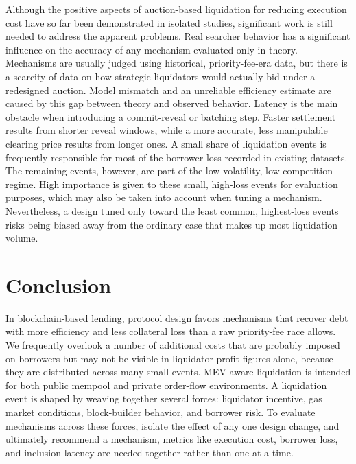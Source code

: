 \documentclass[conference]{IEEEtran}
\begin{document}
Although the positive aspects of auction-based liquidation for reducing
execution cost have so far been demonstrated in isolated studies,
significant work is still needed to address the apparent problems. Real
searcher behavior has a significant influence on the accuracy of any
mechanism evaluated only in theory. Mechanisms are usually judged using
historical, priority-fee-era data, but there is a scarcity of data on
how strategic liquidators would actually bid under a redesigned auction.
Model mismatch and an unreliable efficiency estimate are caused by this
gap between theory and observed behavior. Latency is the main obstacle
when introducing a commit-reveal or batching step. Faster settlement
results from shorter reveal windows, while a more accurate, less
manipulable clearing price results from longer ones. A small share of
liquidation events is frequently responsible for most of the borrower
loss recorded in existing datasets. The remaining events, however, are
part of the low-volatility, low-competition regime. High importance is
given to these small, high-loss events for evaluation purposes, which
may also be taken into account when tuning a mechanism. Nevertheless, a
design tuned only toward the least common, highest-loss events risks
being biased away from the ordinary case that makes up most liquidation
volume.

\section{Conclusion}

In blockchain-based lending, protocol design favors mechanisms that
recover debt with more efficiency and less collateral loss than a raw
priority-fee race allows. We frequently overlook a number of additional
costs that are probably imposed on borrowers but may not be visible in
liquidator profit figures alone, because they are distributed across
many small events. MEV-aware liquidation is intended for both public
mempool and private order-flow environments. A liquidation event is
shaped by weaving together several forces: liquidator incentive, gas
market conditions, block-builder behavior, and borrower risk. To
evaluate mechanisms across these forces, isolate the effect of any one
design change, and ultimately recommend a mechanism, metrics like
execution cost, borrower loss, and inclusion latency are needed together
rather than one at a time.
\end{document}
